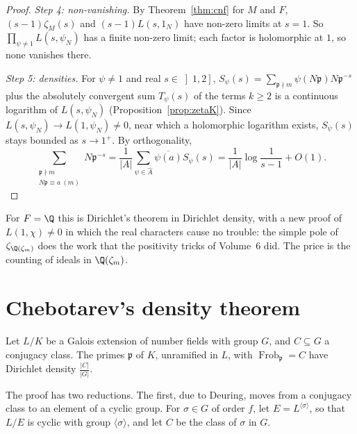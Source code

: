 \begin{proof}
\emph{Step 4: non-vanishing.} By Theorem~\ref{thm:cnf} for $M$ and $F$, $(s-1)\zeta_M(s)$ and $(s-1)L(s,1_N)$ have non-zero limits at $s=1$. So
$\prod_{\psi\ne1}L(s,\psi_N)$ has a finite non-zero limit; each factor is holomorphic at $1$, so none vanishes there.

\emph{Step 5: densities.} For $\psi\ne1$ and real $s\in\left]1,2\right]$, $S_\psi(s)=\sum_{\mathfrak p\nmid m}\psi(N\mathfrak p)N\mathfrak p^{-s}$ plus the
absolutely convergent sum $T_\psi(s)$ of the terms $k\ge2$ is a continuous logarithm of $L(s,\psi_N)$ (Proposition~\ref{prop:zetaK}). Since
$L(s,\psi_N)\to L(1,\psi_N)\ne0$, near which a holomorphic logarithm exists, $S_\psi(s)$ stays bounded as $s\to1^+$. By orthogonality,
\[
\sum_{\substack{\mathfrak p\nmid m\\ N\mathfrak p\equiv a\ (m)}}N\mathfrak p^{-s}=\frac1{|A|}\sum_{\psi\in\widehat A}\overline{\psi(a)}S_\psi(s)
=\frac1{|A|}\log\frac1{s-1}+O(1).
\]
\end{proof}

For $F=\Q$ this is Dirichlet's theorem in Dirichlet density, with a new proof of $L(1,\chi)\ne0$ in which the real characters cause no trouble: the
simple pole of $\zeta_{\Q(\zeta_m)}$ does the work that the positivity tricks of Volume~6 did. The price is the counting of ideals in
$\Q(\zeta_m)$.

\section{Chebotarev's density theorem}

\begin{theorem}\label{thm:chebotarev}
Let $L/K$ be a Galois extension of number fields with group $G$, and $C\subseteq G$ a conjugacy class. The primes $\mathfrak p$ of $K$, unramified in
$L$, with $\operatorname{Frob}_{\mathfrak p}=C$ have Dirichlet density $\frac{|C|}{|G|}$.
\end{theorem}

The proof has two reductions. The first, due to Deuring, moves from a conjugacy class to an element of a cyclic group. For $\sigma\in G$ of
order $f$, let $E=L^{\langle\sigma\rangle}$, so that $L/E$ is cyclic with group $\langle\sigma\rangle$, and let $C$ be the class of $\sigma$ in
$G$.

